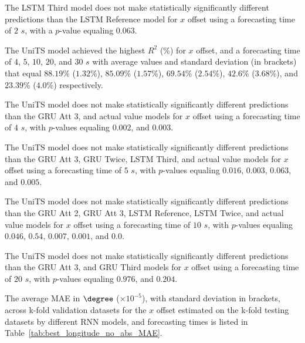The LSTM Third model does not make statistically significantly different predictions than the LSTM Reference model for $x$ offset using a forecasting time of $2$ $s$, with a $p$-value equaling $0.063$.


The UniTS model achieved the highest $R^{2}$ (\%) for $x$ offset, and a forecasting time of $4$, $5$, $10$, $20$, and $30$ $s$ with average values and standard deviation (in brackets) that equal $88.19$\% ($1.32$\%), $85.09$\% ($1.57$\%), $69.54$\% ($2.54$\%), $42.6$\% ($3.68$\%), and $23.39$\% ($4.0$\%) respectively.

The UniTS model does not make statistically significantly different predictions than the GRU Att 3, and actual value models for $x$ offset using a forecasting time of $4$ $s$, with $p$-values equaling $0.002$, and $0.003$.


The UniTS model does not make statistically significantly different predictions than the GRU Att 3, GRU Twice, LSTM Third, and actual value models for $x$ offset using a forecasting time of $5$ $s$, with $p$-values equaling $0.016$, $0.003$, $0.063$, and $0.005$.


The UniTS model does not make statistically significantly different predictions than the GRU Att 2, GRU Att 3, LSTM Reference, LSTM Twice, and actual value models for $x$ offset using a forecasting time of $10$ $s$, with $p$-values equaling $0.046$, $0.54$, $0.007$, $0.001$, and $0.0$.


The UniTS model does not make statistically significantly different predictions than the GRU Att 3, and GRU Third models for $x$ offset using a forecasting time of $20$ $s$, with $p$-values equaling $0.976$, and $0.204$.


The average MAE in $\degree$ ($\times 10^{-5}$), with standard deviation in brackets, across k-fold validation datasets for the $x$ offset estimated on the k-fold testing datasets by different RNN models, and forecasting times is listed in Table~\ref{tab:best_longitude_no_abs_MAE}.

